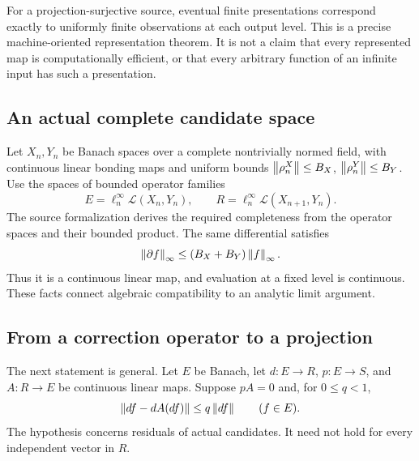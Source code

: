 \begin{insight}
For a projection-surjective source, eventual finite presentations correspond exactly to uniformly finite observations at each output level. This is a precise machine-oriented representation theorem. It is not a claim that every represented map is computationally efficient, or that every arbitrary function of an infinite input has such a presentation.
\end{insight}



\label{KS:sec:split}
\subsection{An actual complete candidate space}
Let \(X_n,Y_n\) be Banach spaces over a complete nontrivially normed field, with continuous linear bonding maps and uniform bounds \(\left\lVert\rho^X_n\right\rVert\le B_X\), \(\left\lVert\rho^Y_n\right\rVert\le B_Y\). Use the spaces of bounded operator families
\[
 E=\ell^\infty_n\mathcal L(X_n,Y_n),\qquad
 R=\ell^\infty_n\mathcal L(X_{n+1},Y_n).
\]
The source formalization derives the required completeness from the operator spaces and their bounded product. The same differential satisfies
\[
 \left\lVert\partial f\right\rVert_\infty\le(B_X+B_Y)\left\lVert f\right\rVert_\infty.
\]
Thus it is a continuous linear map, and evaluation at a fixed level is continuous. These facts connect algebraic compatibility to an analytic limit argument.

\subsection{From a correction operator to a projection}
The next statement is general. Let \(E\) be Banach, let \(d:E\to R\), \(p:E\to S\), and \(A:R\to E\) be continuous linear maps. Suppose \(pA=0\) and, for \(0\le q<1\),
\begin{equation}\label{KS:eq:contraction}
 \left\lVert df-dA(df)\right\rVert\le q\left\lVert df\right\rVert\qquad(f\in E).
\end{equation}
The hypothesis concerns residuals of actual candidates. It need not hold for every independent vector in \(R\).

